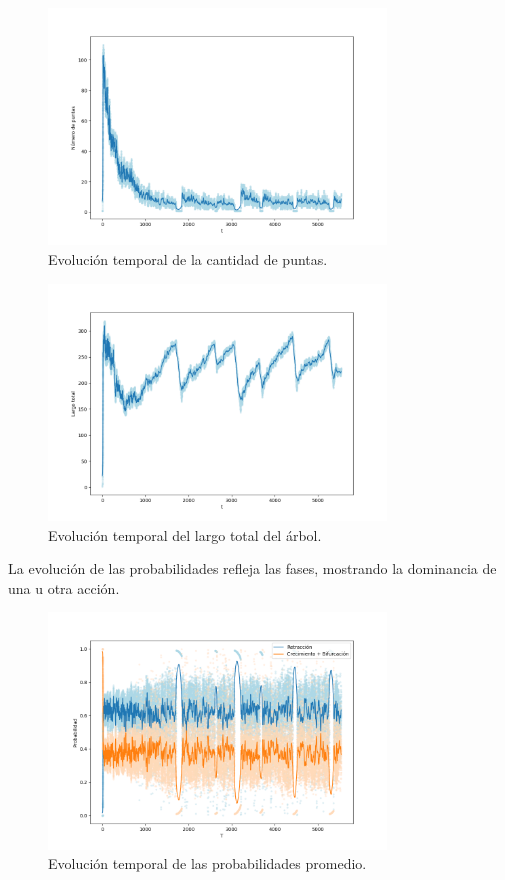 \documentclass{article}
\begin{document}
\begin{figure}[h!]
    \centering
    \includegraphics[width=0.8\textwidth]{graficos_inst/N_vs_tiempo.png}
    \caption[]{Evolución temporal de la cantidad de puntas.\footnotemark}
    \label{fig:evolucion_N}
\end{figure}

\begin{figure}[h!]
    \centering
    \includegraphics[width=0.8\textwidth]{graficos_inst/largo_vs_tiempo.png}
    \caption{Evolución temporal del largo total del árbol.}
    \label{fig:evolucion_tamano}
\end{figure}

La evolución de las probabilidades refleja las fases, mostrando la dominancia de una u otra acción.

\begin{figure}[h!]
    \centering
    \includegraphics[width=0.8\textwidth]{graficos_inst/probs_vs_tiempo.png}
    \caption{Evolución temporal de las probabilidades promedio.}
    \label{fig:evolucion_probabilidades}
\end{figure}
\end{document}
